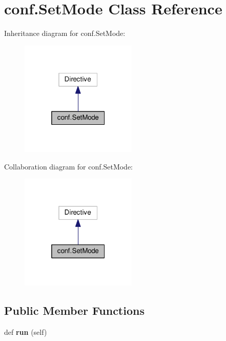 \hypertarget{classconf_1_1SetMode}{}\section{conf.\+Set\+Mode Class Reference}
\label{classconf_1_1SetMode}


Inheritance diagram for conf.\+Set\+Mode\+:
\nopagebreak
\begin{figure}[H]
\begin{center}
\leavevmode
\includegraphics[width=157pt]{classconf_1_1SetMode__inherit__graph}
\end{center}
\end{figure}


Collaboration diagram for conf.\+Set\+Mode\+:
\nopagebreak
\begin{figure}[H]
\begin{center}
\leavevmode
\includegraphics[width=157pt]{classconf_1_1SetMode__coll__graph}
\end{center}
\end{figure}
\subsection*{Public Member Functions}
\begin{DoxyCompactItemize}
\item 
def {\bfseries run} (self)\hypertarget{classconf_1_1SetMode_ac3e12cb0da9b23a8e299fbd202fa9253}{}\label{classconf_1_1SetMode_ac3e12cb0da9b23a8e299fbd202fa9253}

\end{DoxyCompactItemize}
